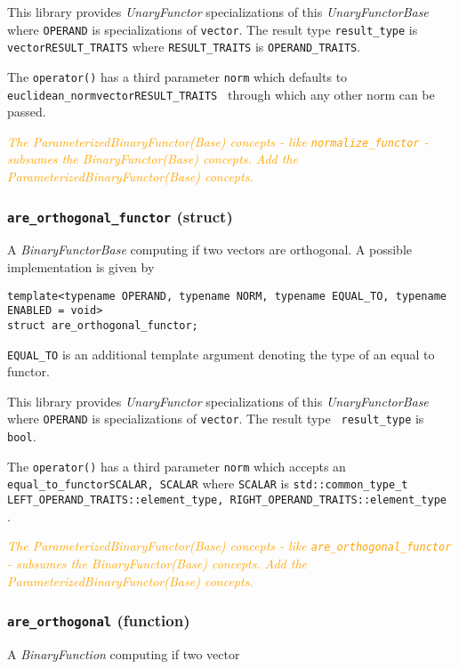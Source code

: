\documentclass[oneside]{book}
\begin{document}
This library provides \textit{UnaryFunctor} specializations of this \textit{UnaryFunctorBase} where
\texttt{OPERAND} is specializations of \texttt{vector}. The result type \texttt{result\_type}    is
\texttt{vector\textlangle RESULT\_TRAITS\textrangle} where \texttt{RESULT\_TRAITS}               is
\texttt{OPERAND\_TRAITS}.\newline

The \texttt{operator()} has a third parameter  \texttt{norm} which defaults to
\texttt{euclidean\_norm\textlangle vector\textlangle RESULT\_TRAITS\textrangle
\textrangle} through which any other norm can be passed.\newline

\textit{\textcolor{orange}{The \textit{ParameterizedBinaryFunctor(Base)} concepts - like
\texttt{normalize\_functor}       - subsumes the \textit{BinaryFunctor(Base)}  concepts.
Add the \textit{ParameterizedBinaryFunctor(Base) concepts.}}}

\subsubsection{\texttt{are\_orthogonal\_functor} (struct)}
A \textit{BinaryFunctorBase} computing if two vectors are orthogonal.
A possible implementation is given by
\begin{verbatim}
template<typename OPERAND, typename NORM, typename EQUAL_TO, typename ENABLED = void>
struct are_orthogonal_functor;
\end{verbatim}
\texttt{EQUAL\_TO} is an additional template argument denoting the type of an equal to functor.\newline

This library provides \textit{UnaryFunctor} specializations of this \textit{UnaryFunctorBase}
where \texttt{OPERAND} is specializations of \texttt{vector}. The result type        \texttt{
result\_type} is \texttt{bool}.\newline

The \texttt{operator()} has a third parameter \texttt{norm}   which accepts an
\texttt{equal\_to\_functor\textlangle SCALAR, SCALAR\textrangle}         where
\texttt{SCALAR} is \texttt{std::common\_type\_t                    \textlangle
LEFT\_OPERAND\_TRAITS::element\_type,    RIGHT\_OPERAND\_TRAITS::element\_type
\textrangle}.\newline

\textit{\textcolor{orange}{The \textit{ParameterizedBinaryFunctor(Base)} concepts - like
\texttt{are\_orthogonal\_functor} - subsumes the \textit{BinaryFunctor(Base)}  concepts.
Add the \textit{ParameterizedBinaryFunctor(Base) concepts.}}}

\subsubsection{\texttt{are\_orthogonal} (function)}
A \textit{BinaryFunction} computing if two vector
\end{document}
